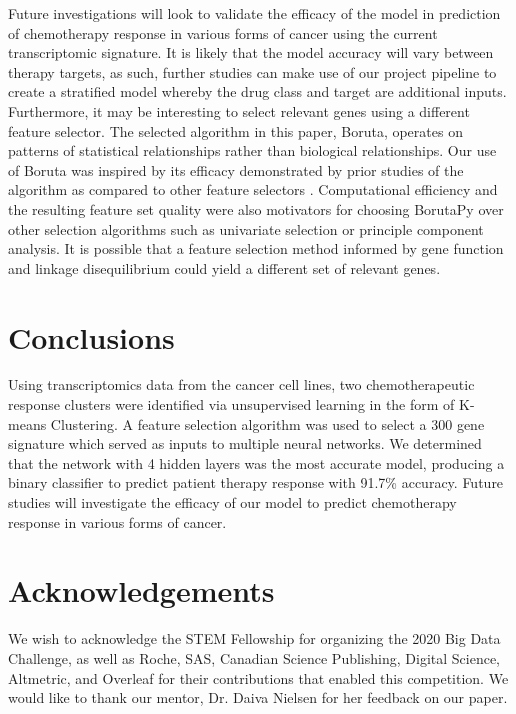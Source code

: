 \documentclass[10pt, letterpaper]{article}
\begin{document}
\begin{multicols}{2}
Future investigations will look to validate the efficacy of the model in prediction of chemotherapy response in various forms of cancer using the current transcriptomic signature. It is likely that the model accuracy will vary between therapy targets, as such, further studies can make use of our project pipeline to create a stratified model whereby the drug class and target are additional inputs. Furthermore, it may be interesting to select relevant genes using a different feature selector. The selected algorithm in this paper, Boruta, operates on patterns of statistical relationships rather than biological relationships. Our use of Boruta was inspired by its efficacy demonstrated by prior studies of the algorithm as compared to other feature selectors \cite{boruta, deep_cell}. Computational efficiency and the resulting feature set quality were also motivators for choosing BorutaPy over other selection algorithms such as univariate selection or principle component analysis. It is possible that a feature selection method informed by gene function and linkage disequilibrium could yield a different set of relevant genes.


\section{Conclusions}
Using transcriptomics data from the cancer cell lines, two chemotherapeutic response clusters were identified via unsupervised learning in the form of K-means Clustering. A feature selection algorithm was used to select a 300 gene signature which served as inputs to multiple neural networks. We determined that the network with 4 hidden layers was the most accurate model, producing a binary classifier to predict patient therapy response with 91.7\% accuracy. Future studies will investigate the efficacy of our model to predict chemotherapy response in various forms of cancer.


\section*{Acknowledgements}
We wish to acknowledge the STEM Fellowship for organizing the 2020 Big Data Challenge, as well as Roche, SAS, Canadian Science Publishing, Digital Science, Altmetric, and Overleaf for their contributions that enabled this competition. We would like to thank our mentor, Dr. Daiva Nielsen for her feedback on our paper.




\end{multicols}
\end{document}
